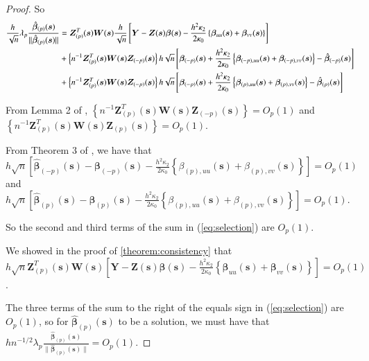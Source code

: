 \documentclass[authoryear, review, 11pt]{elsarticle}
\begin{document}
\begin{proof}
        So
        \begin{align}\label{eq:selection}
            \frac{h}{\sqrt{n}} \lambda_p \frac{ \hat{\bm{\beta}}_{(p)}(\bm{s}) }{\| \hat{\bm{\beta}}_{(p)}(\bm{s}) \|} &= \bm{Z}_{(p)}^T(\bm{s}) \bm{W}(\bm{s}) \frac{h}{\sqrt{n}} \left[ \bm{Y} - \bm{Z}(\bm{s}) \bm{\beta}(\bm{s}) - \frac{h^2 \kappa_2}{2 \kappa_0} \left\{ \bm{\beta}_{uu}(\bm{s}) + \bm{\beta}_{vv}(\bm{s}) \right\} \right] \notag \\ 
            &+ \left\{ n^{-1}  \bm{Z}_{(p)}^T(\bm{s}) \bm{W}(\bm{s}) \bm{Z}_{(-p)}(\bm{s}) \right\} h \sqrt{n} \left[ \bm{\beta}_{(-p)}(\bm{s}) + \frac{h^2 \kappa_2}{2 \kappa_0} \left\{ \bm{\beta}_{(-p),uu}(\bm{s}) + \bm{\beta}_{(-p),vv}(\bm{s}) \right\} - \hat{\bm{\beta}}_{(-p)}(\bm{s}) \right] \notag \\
            &+ \left\{ n^{-1} \bm{Z}_{(p)}^T(\bm{s}) \bm{W}(\bm{s}) \bm{Z}_{(-p)}(\bm{s}) \right\} h \sqrt{n} \left[ \bm{\beta}_{(-p)}(\bm{s}) + \frac{h^2 \kappa_2}{2 \kappa_0} \left\{ \bm{\beta}_{(p),uu}(\bm{s}) + \bm{\beta}_{(p),vv}(\bm{s}) \right\} - \hat{\bm{\beta}}_{(p)}(\bm{s}) \right]
        \end{align}

        From Lemma 2 of \cite{Sun-Yan-Zhang-Lu-2014}, $\left\{ n^{-1} \bm{Z}_{(p)}^T(\bm{s}) \bm{W}(\bm{s}) \bm{Z}_{(-p)}(\bm{s}) \right\} = O_p(1)$ and $\left\{ n^{-1} \bm{Z}_{(p)}^T(\bm{s}) \bm{W}(\bm{s}) \bm{Z}_{(p)}(\bm{s}) \right\} = O_p(1)$.
        
        From Theorem 3 of \cite{Sun-Yan-Zhang-Lu-2014}, we have that $h \sqrt{n} \left[ \hat{\bm{\beta}}_{(-p)} (\bm{s}) - \bm{\beta}_{(-p)}(\bm{s}) - \frac{h^2 \kappa_2}{2 \kappa_0} \left\{ \beta_{(p),uu}(\bm{s}) + \beta_{(p),vv}(\bm{s}) \right\}\right] = O_p(1)$ and $h \sqrt{n} \left[ \hat{\bm{\beta}}_{(p)}(\bm{s}) - \bm{\beta}_{(p)}(\bm{s}) - \frac{h^2 \kappa_2}{2 \kappa_0} \left\{ \beta_{(p),uu}(\bm{s}) + \beta_{(p),vv}(\bm{s}) \right\} \right] = O_p(1)$.
        
        So the second and third terms of the sum in (\ref{eq:selection}) are $O_p(1)$.
        
        We showed in the proof of \ref{theorem:consistency} that $h  \sqrt{n} \bm{Z}_{(p)}^T(\bm{s}) \bm{W}(\bm{s}) \left[ \bm{Y} - \bm{Z}(\bm{s}) \bm{\beta}(\bm{s}) - \frac{h^2 \kappa_2}{2 \kappa_0} \left\{ \bm{\beta}_{uu}(\bm{s}) + \bm{\beta}_{vv}(\bm{s}) \right\} \right]= O_p(1)$.

        The three terms of the sum to the right of the equals sign in (\ref{eq:selection}) are $O_p(1)$, so for $\hat{\bm{\beta}}_{(p)} (\bm{s})$ to be a solution, we must have that $h n^{-1/2} \lambda_p \frac{ \hat{\bm{\beta}}_{(p)} (\bm{s}) }{\| \hat{\bm{\beta}}_{(p)} (\bm{s}) \|} = O_p(1)$.


\end{proof}
\end{document}
